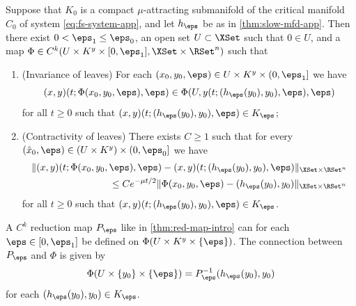\documentclass[a4paper]{siamart190516}
\begin{document}
\begin{theorem}\label{thm:red-map-app} 
Suppose that $K_0$ is a compact $\mu$-attracting submanifold of the critical manifold
$C_0$ of system \cref{eq:fs-system-app}, and let $h_{\eps}$ be as in \cref{thm:slow-mfd-app}. 
Then there exist $0 < \eps_1 \leq \eps_0$, an open set $U \subset \XSet$ 
such that $0 \in U$, and a map $\Phi \in C^{k}(U \times K^y  \times [0,\eps_1], \XSet \times \RSet^n)$ such that
\begin{enumerate}
\item(Invariance of leaves) For each $(x_0,y_0, \eps) \in U \times K^y \times (0,\eps_1]$ we have
\[
(x,y)(t; \Phi(x_0,y_0,\eps),\eps) \in \Phi (U, y(t; (h_{\eps}(y_0),y_0),\eps), \eps)
\]
for all $t \geq 0$ such that $(x,y)(t; (h_{\eps}(y_0),y_0),\eps) \in K_{\eps}$;
\item(Contractivity of leaves) There exists $C \geq 1$ such that for every $(\hat{x}_0, \eps) \in (U \times K^y)  \times (0,\eps_0]$ we have
\begin{align*}
& \| (x,y)(t; \Phi(x_0, y_0, \eps), \eps) -  (x,y)(t; (h_{\eps}(y_0),y_0),\eps)\|_{\XSet \times \RSet^n} \\
&\qquad \qquad \qquad \qquad \leq C e^{-\mu t / 2} \| \Phi(x_0,y_0,\eps) - (h_{\eps}(y_0),y_0)  \|_{\XSet \times \RSet^n} 
\end{align*}
for all $t \geq 0$ such that $(x,y)(t; (h_{\eps}(y_0),y_0),\eps) \in K_{\eps}$.
\end{enumerate}
\end{theorem}

A  $C^k$ reduction map $P_{\eps}$ like in \cref{thm:red-map-intro} can for each $\eps \in [0,\eps_1]$ be defined on $\Phi(U \times K^y \times \{ \eps\})$. The connection between $P_{\eps}$ and $\Phi$ is given by
\[
\Phi(U \times \{ y_0 \} \times \{\eps\}) = P^{-1}_{\eps} (h_{\eps}(y_0),y_0)
\]
for each $(h_{\eps}(y_0),y_0) \in K_{\eps}$. 
\end{document}
